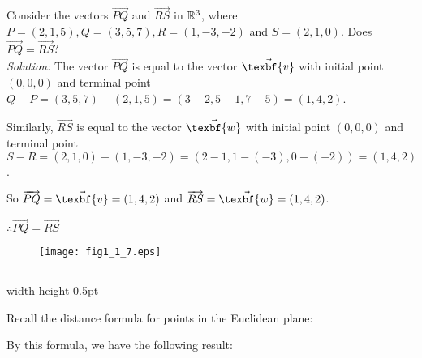\begin{exmp}
 Consider the vectors $\overrightarrow{PQ}$ and $\overrightarrow{RS}$ in $\mathbb{R}^{3}$, where $P = (2,1,5),
 Q = (3,5,7), R = (1,-3,-2)$ and $S = (2,1,0)$.  Does $\overrightarrow{PQ} =
 \overrightarrow{RS}$?\\\emph{Solution:}
 The vector $\overrightarrow{PQ}$ is equal to the vector $\vec{\texbf{v}}$ with
 initial point $(0,0,0)$ and terminal point $Q - P = (3,5,7) - (2,1,5) = (3 - 2,5 - 1,7 - 5) = (1,4,2)$.
 \par\noindent
 Similarly, $\overrightarrow{RS}$ is equal to the vector $\vec{\texbf{w}}$ with
 initial point $(0,0,0)$ and terminal point $S - R = (2,1,0) - (1,-3,-2) = (2 - 1, 1 - (-3),0 - (-2)) = (1,4,2)$.
 \par\noindent
 So $\overrightarrow{PQ} = \vec{\texbf{v}} = (1,4,2)$ and $\overrightarrow{RS} = \vec{\texbf{w}} = (1,4,2)$.
 \par\noindent
 $\therefore \overrightarrow{PQ} = \overrightarrow{RS}$
\end{exmp}
\begin{figure}[h]
 \begin{center}
  \texttt{[image: fig1\_1\_7.eps]}
 \end{center}
 \caption[]{}
 \label{fig:ex1.2}
\end{figure}
\hrule width \textwidth height 0.5pt
\vspace{4mm}

Recall the distance formula for points in the Euclidean plane:

\vspace{3mm}
\vspace{3mm}

By this formula, we have the following result:

\vspace{3mm}

